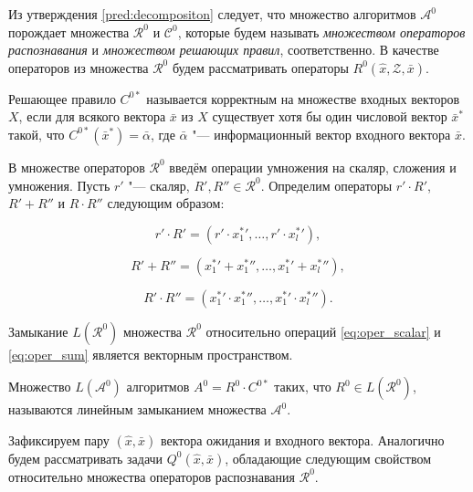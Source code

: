 Из утверждения \ref{pred:decompositon} следует, что множество алгоритмов $\mathcal A^0$ порождает множества $\mathcal R^0$ и $\mathcal C^0$, которые будем называть \textit{множеством операторов распознавания} и \textit{множеством решающих правил}, соответственно. В качестве операторов из множества $\mathcal R^0$ будем рассматривать операторы $R^0(\hat x,\mathcal Z,\bar x)$.
	
\begin{Def}
	Решающее правило $C^{0*}$ называется корректным на множестве входных векторов $X$, если для всякого вектора $\bar x$ из $X$ существует хотя бы один числовой вектор $\bar x^*$ такой, что $C^{0*}(\bar x^*)=\bar\alpha$, где $\bar\alpha$ "--- информационный вектор входного вектора $\bar x$.
\end{Def}

В множестве операторов $\mathcal R^0$ введём операции умножения на скаляр, сложения и умножения. Пусть $r'$ "--- скаляр, $R',R''\in\mathcal R^0$. Определим операторы $r'\cdot R'$, $R'+R''$ и $R\cdot R''$ следующим образом:
	
\begin{equation}
\label{eq:oper_scalar}
	r'{\cdot}R'=(r'{\cdot}{x_1^*}',\dots,r'{\cdot}{x_l^*}'),
\end{equation}

\begin{equation}
\label{eq:oper_sum}
	R'+R''=({x_1^*}'+{x_1^*}'',\dots,{x_1^*}'+{x_l^*}''),
\end{equation}

\begin{equation}
\label{eq:oper_mult}
	R'{\cdot}R''=({x_1^*}'{\cdot}{x_1^*}'',\dots,{x_1^*}'{\cdot}{x_l^*}'').
\end{equation}
	
\begin{Pred}
	Замыкание $L(\mathcal R^0)$ множества $\mathcal R^0$ относительно операций \eqref{eq:oper_scalar} и \eqref{eq:oper_sum} является векторным пространством.
\end{Pred}

\begin{Def}
	Множество $L(\mathcal A^0)$ алгоритмов $A^0=R^0\cdot C^{0*}$ таких, что $R^0\in L(\mathcal R^0)$, называются линейным замыканием множества $\mathcal A^0$.
\end{Def}

Зафиксируем пару $(\hat{x},\bar{x})$ вектора ожидания и входного вектора. Аналогично \cite{Zhuravlev1977} будем рассматривать задачи $Q^0(\hat{x},\bar{x})$, обладающие следующим свойством относительно множества операторов распознавания $\mathcal R^0$.
	
